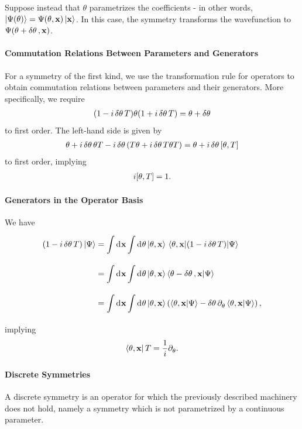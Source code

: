 Suppose instead that $\theta$ parametrizes the coefficients - in other words, $\ket{\Psi(\theta)} = \Psi(\theta, \vb{x})\ket{\vb{x}}$. In this case, the symmetry transforms the wavefunction to $\Psi(\theta + \var{\theta}, \vb{x})$.

\paragraph{Commutation Relations Between Parameters and Generators}
For a symmetry of the first kind, we use the transformation rule for operators to obtain commutation relations between parameters and their generators. More specifically, we require
\begin{align*}
	(1 - i\var{\theta}T)\theta(1 + i\var{\theta}T) = \theta + \var{\theta}
\end{align*}
to first order. The left-hand side is given by
\begin{align*}
	\theta + i\var{\theta}\theta T - i\var{\theta}(T\theta + i\var{\theta}T\theta T) = \theta + i\var{\theta}\comm{\theta}{T}
\end{align*}
to first order, implying
\begin{align*}
	i\comm{\theta}{T} = 1.
\end{align*}

\paragraph{Generators in the Operator Basis}
We have
\begin{align*}
	\left(1 - i\var{\theta}T\right)\ket{\Psi} &= \int\limits_{}^{}\dd[]{\vb{x}}\int\limits_{}^{}\dd[]{\theta}\ket{\theta, \vb{x}}\mel{\theta, \vb{x}}{\left(1 - i\var{\theta}T\right)}{\Psi} \\
	                                          &= \int\limits_{}^{}\dd[]{\vb{x}}\int\limits_{}^{}\dd[]{\theta}\ket{\theta, \vb{x}}\braket{\theta - \var{\theta}, \vb{x}}{\Psi} \\
	                                          &= \int\limits_{}^{}\dd[]{\vb{x}}\int\limits_{}^{}\dd[]{\theta}\ket{\theta, \vb{x}}\left(\braket{\theta, \vb{x}}{\Psi} - \var{\theta}\partial_{\theta}^{}\braket{\theta, \vb{x}}{\Psi}\right),
\end{align*}
implying
\begin{align*}
	\bra{\theta, \vb{x}}T = \frac{1}{i}\partial_{\theta}^{}.
\end{align*}

\paragraph{Discrete Symmetries}
A discrete symmetry is an operator for which the previously described machinery does not hold, namely a symmetry which is not parametrized by a continuous parameter.

